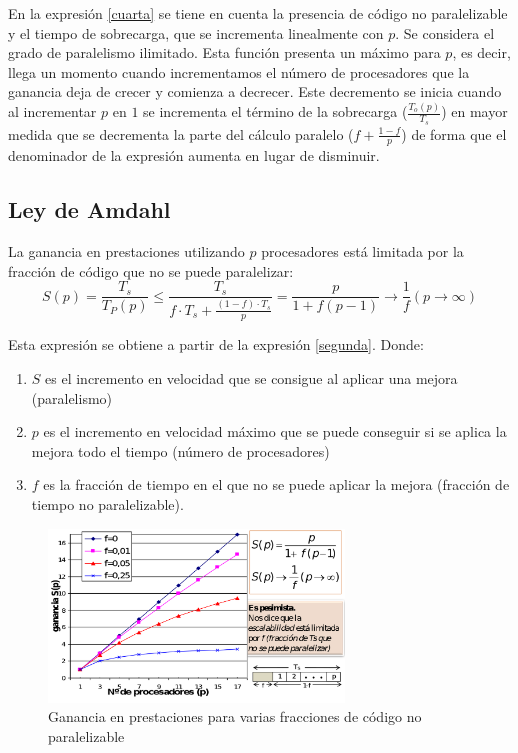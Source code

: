 \documentclass[10pt,a4paper,spanish]{report}
\begin{document}
En la expresión \ref*{cuarta} se tiene en cuenta la presencia de código no paralelizable y el tiempo de sobrecarga, que se incrementa linealmente con $p$. Se considera el grado de paralelismo ilimitado. Esta función presenta un máximo para $p$, es decir, llega un momento cuando incrementamos el número de procesadores que la ganancia deja de crecer y comienza a decrecer. Este decremento se inicia cuando al incrementar $p$ en $1$ se incrementa el término de la sobrecarga ($\frac{T_o(p)}{T_s}$) en mayor medida que se decrementa la parte del cálculo paralelo ($f + \frac{1-f}{p}$) de forma que el denominador de la expresión aumenta en lugar de disminuir.

\textcolor[rgb]{0.2,0.4,0.8}{\subsection{Ley de Amdahl}}
La ganancia en prestaciones utilizando $p$ procesadores está limitada por la fracción de código que no se puede paralelizar:
\begin{displaymath}
S(p) = \frac{T_s}{T_P(p)} \leq \frac{T_s}{f\cdot T_s + \frac{(1-f)\cdot T_s}{p}} = \frac{p}{1+f(p-1)} \rightarrow \frac{1}{f} (p \rightarrow \infty)
\end{displaymath}

Esta expresión se obtiene a partir de la expresión \hyperref[segunda]{\ref{segunda}}. Donde:
\begin{enumerate}[\color{azul}{\bf $\heartsuit$}]
    \item $S$ es el incremento en velocidad que se consigue al aplicar una mejora (paralelismo)
    \item $p$ es el incremento en velocidad máximo que se puede conseguir si se aplica la mejora todo el tiempo (número de procesadores)
    \item $f$ es la fracción de tiempo en el que no se puede aplicar la mejora (fracción de tiempo no paralelizable).
\end{enumerate}

\begin{figure}[!h]
\centering
\includegraphics[width=0.7\textwidth]{50}
\caption{Ganancia en prestaciones para varias fracciones de código no paralelizable}
\label{ley_de_a}
\end{figure}
\end{document}
